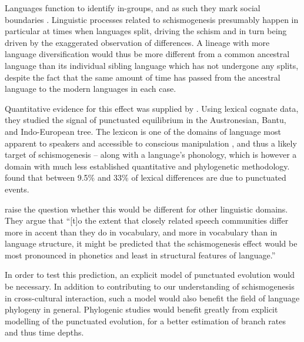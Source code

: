 \documentclass[]{rsos}%
\begin{document}
Languages function to identify in-groups, and as such they mark social
boundaries \parencite{labov1963social,epps2020amazonian}.
Linguistic processes related to schismogenesis presumably happen in particular
at times when languages split, driving the schism and in turn being driven by
the exaggerated observation of differences. A lineage with more language
diversification would thus be more different from a common ancestral language than its individual sibling language which has not undergone any splits, despite the fact that the same amount of time has passed from the ancestral language to the modern languages in each case.

Quantitative evidence for this effect was supplied by
\textcite{atkinson2008languages}. Using lexical cognate data, they studied the
signal of punctuated equilibrium \parencite{eldredge1972punctuated} in the Austronesian, Bantu, and Indo-European tree. 
The lexicon is one of the domains of language most apparent to speakers and accessible to conscious manipulation \parencite[see][for an extensive discussion]{thomason2007language},
and thus a likely target of schismogenesis --
along with a language's phonology, which is however a domain
with much less established quantitative and phylogenetic methodology.
 found that between 9.5\% and 33\% of lexical
differences are due to punctuated events.


\Textcite{gray2013three} raise the question whether this would be different for
other linguistic domains. They argue that “[t]o the extent that closely
related speech communities differ more in accent than they do in vocabulary, and
more in vocabulary than in language structure, it might be predicted that the
schismogenesis effect would be most pronounced in phonetics and least in
structural features of language.” \parencite[p. 295]{gray2013three}

In order to  test this prediction, an explicit model of punctuated
evolution would be necessary. In addition to contributing to our understanding
of schismogenesis in cross-cultural interaction, such a model would
also benefit the field of language phylogeny in general.
Phylogenic studies would benefit greatly from explicit modelling of
the punctuated evolution, for a better estimation of branch rates and thus time
depths.
\end{document}
